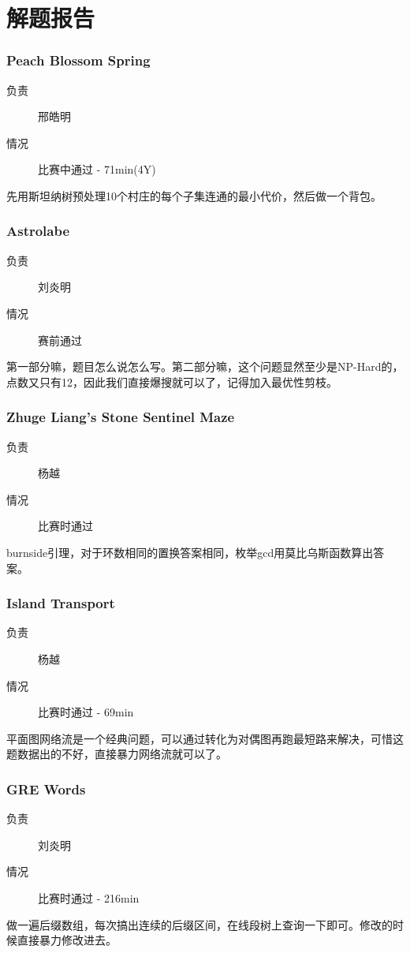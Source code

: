 \documentclass[a4paper, 11pt, nofonts, nocap, fancyhdr]{ctexart}
\newcommand{\problem}[1]{\subsubsection{#1}}
\begin{document}
\section{解题报告}


\problem{Peach Blossom Spring}

\begin{description}
\item[负责] 邢皓明
\item[情况] 比赛中通过 - 71min(4Y)
\end{description}

先用斯坦纳树预处理10个村庄的每个子集连通的最小代价，然后做一个背包。

\problem{Astrolabe}

\begin{description}
\item[负责] 刘炎明
\item[情况] 赛前通过
\end{description}

第一部分嘛，题目怎么说怎么写。第二部分嘛，这个问题显然至少是NP-Hard的，点数又只有12，因此我们直接爆搜就可以了，记得加入最优性剪枝。

\problem{Zhuge Liang's Stone Sentinel Maze}

\begin{description}
\item[负责] 杨越
\item[情况] 比赛时通过
\end{description}

burnside引理，对于环数相同的置换答案相同，枚举gcd用莫比乌斯函数算出答案。

\problem{Island Transport}

\begin{description}
\item[负责] 杨越
\item[情况] 比赛时通过 - 69min
\end{description}

平面图网络流是一个经典问题，可以通过转化为对偶图再跑最短路来解决，可惜这题数据出的不好，直接暴力网络流就可以了。

\problem{GRE Words}

\begin{description}
\item[负责] 刘炎明
\item[情况] 比赛时通过 - 216min
\end{description}

做一遍后缀数组，每次搞出连续的后缀区间，在线段树上查询一下即可。修改的时候直接暴力修改进去。
\end{document}
